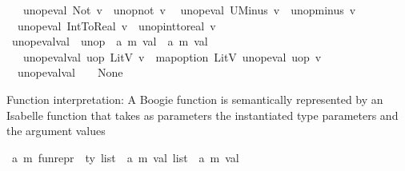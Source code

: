 \begin{isabellebody}
\ \ \ {\isachardoublequoteopen}unop{\isacharunderscore}{\kern0pt}eval\ Not\ v\ {\isacharequal}{\kern0pt}\ unop{\isacharunderscore}{\kern0pt}not\ v{\isachardoublequoteclose}\isanewline
\ {\isacharbar}{\kern0pt}\ {\isachardoublequoteopen}unop{\isacharunderscore}{\kern0pt}eval\ UMinus\ v\ {\isacharequal}{\kern0pt}\ unop{\isacharunderscore}{\kern0pt}minus\ v{\isachardoublequoteclose}\isanewline
\ {\isacharbar}{\kern0pt}\ {\isachardoublequoteopen}unop{\isacharunderscore}{\kern0pt}eval\ IntToReal\ v\ {\isacharequal}{\kern0pt}\ unop{\isacharunderscore}{\kern0pt}int{\isacharunderscore}{\kern0pt}to{\isacharunderscore}{\kern0pt}real\ v{\isachardoublequoteclose}\isanewline
\isanewline
{}\isamarkupfalse%
\ unop{\isacharunderscore}{\kern0pt}eval{\isacharunderscore}{\kern0pt}val\ {\isacharcolon}{\kern0pt}{\isacharcolon}{\kern0pt}\ {\isachardoublequoteopen}unop\ {\isasymRightarrow}\ {\isacharparenleft}{\kern0pt}{\isacharprime}{\kern0pt}a{\isacharcomma}{\kern0pt}\ {\isacharprime}{\kern0pt}m{\isacharparenright}{\kern0pt}\ val\ {\isasymrightharpoonup}\ {\isacharparenleft}{\kern0pt}{\isacharprime}{\kern0pt}a{\isacharcomma}{\kern0pt}\ {\isacharprime}{\kern0pt}m{\isacharparenright}{\kern0pt}\ val{\isachardoublequoteclose}\isanewline
\ \ \isanewline
\ \ \ {\isachardoublequoteopen}unop{\isacharunderscore}{\kern0pt}eval{\isacharunderscore}{\kern0pt}val\ uop\ {\isacharparenleft}{\kern0pt}LitV\ v{\isacharparenright}{\kern0pt}\ {\isacharequal}{\kern0pt}\ map{\isacharunderscore}{\kern0pt}option\ LitV\ {\isacharparenleft}{\kern0pt}unop{\isacharunderscore}{\kern0pt}eval\ uop\ v{\isacharparenright}{\kern0pt}{\isachardoublequoteclose}\isanewline
\ {\isacharbar}{\kern0pt}\ {\isachardoublequoteopen}unop{\isacharunderscore}{\kern0pt}eval{\isacharunderscore}{\kern0pt}val\ {\isacharunderscore}{\kern0pt}\ {\isacharunderscore}{\kern0pt}\ {\isacharequal}{\kern0pt}\ None{\isachardoublequoteclose}%
\isadelimdocument
%
\endisadelimdocument
%
\isatagdocument
%
\isamarkuptrue%
%
\endisatagdocument
{\isafolddocument}%
%
\isadelimdocument
%
\endisadelimdocument
%
\begin{isamarkuptext}%
Function interpretation:
  A Boogie function is semantically represented by an Isabelle function that takes as parameters the 
  instantiated type parameters and the argument values%
\end{isamarkuptext}\isamarkuptrue%
\isamarkupfalse%
\ {\isacharparenleft}{\kern0pt}{\isacharprime}{\kern0pt}a{\isacharcomma}{\kern0pt}\ {\isacharprime}{\kern0pt}m{\isacharparenright}{\kern0pt}\ fun{\isacharunderscore}{\kern0pt}repr\ {\isacharequal}{\kern0pt}\ {\isachardoublequoteopen}ty\ list\ {\isasymRightarrow}\ {\isacharparenleft}{\kern0pt}{\isacharprime}{\kern0pt}a{\isacharcomma}{\kern0pt}\ {\isacharprime}{\kern0pt}m{\isacharparenright}{\kern0pt}\ val\ list\ {\isasymrightharpoonup}\ {\isacharparenleft}{\kern0pt}{\isacharprime}{\kern0pt}a{\isacharcomma}{\kern0pt}\ {\isacharprime}{\kern0pt}m{\isacharparenright}{\kern0pt}\ val{\isachardoublequoteclose}\isanewline

\end{isabellebody}
